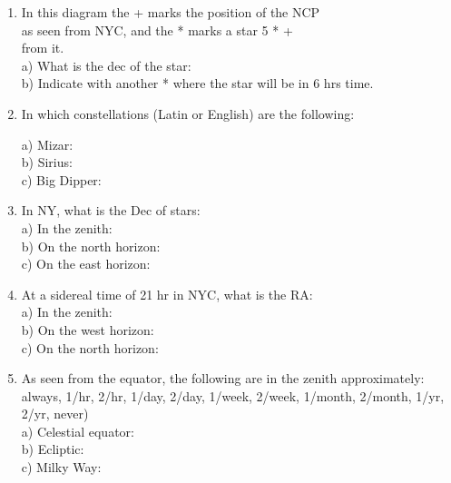\documentclass[11pt]{article}
\begin{document}
\begin{enumerate}


\vspace{0.5cm}
\item
In this diagram the + marks the position of the NCP \\
as seen from NYC, and the * marks a star 5\deg {\hspace{3cm}} *
{\hspace{1.5cm}}+ \\ 
from it. \\
a) What is the dec of the star: \makebox[3cm]{\hrulefill} \\
b) Indicate with another * where the star will be in 6 hrs time.


\vspace{0.5cm}
\item
In which constellations (Latin or English) are the following:

\medskip
a) Mizar:  \makebox[3cm]{\hrulefill} \\
b) Sirius:  \makebox[3cm]{\hrulefill}  \\
c) Big Dipper:  \makebox[3cm]{\hrulefill}

\vspace{0.5cm}
\item
In NY, what is the Dec of stars:\\
a) In the zenith:  \makebox[3cm]{\hrulefill} \\
b) On the north horizon:  \makebox[3cm]{\hrulefill} \\
c) On the east horizon:  \makebox[3cm]{\hrulefill}


\vspace{0.5cm}
\item
At a sidereal time of 21 hr in NYC, what is the RA: 
\\
a) In the zenith: \makebox[3cm]{\hrulefill} \\
b) On the west horizon: \makebox[3cm]{\hrulefill} \\
c) On the north horizon: \makebox[3cm]{\hrulefill} 

\vspace{0.5cm}
\item
As seen from the equator, the following are in the zenith approximately: \\
always, 1/hr, 2/hr, 1/day, 2/day, 1/week, 2/week, 1/month, 2/month,
1/yr, 2/yr, never) \\
a) Celestial equator:  \makebox[3cm]{\hrulefill} \\
b) Ecliptic: \makebox[3cm]{\hrulefill}\\
c) Milky Way: \makebox[3cm]{\hrulefill}



\end{enumerate}
\end{document}
